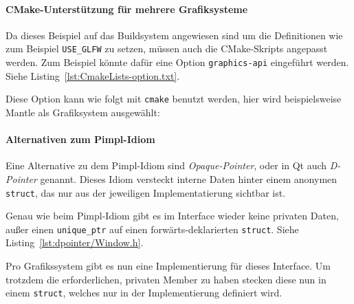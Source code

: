 \documentclass[12pt, a4paper, titlepage, hidelinks]{scrreprt}
\begin{document}
\paragraph{CMake-Unterstützung für mehrere Grafiksysteme}
Da dieses Beispiel auf das Buildsystem angewiesen sind um die Definitionen wie zum Beispiel \texttt{USE\_GLFW} zu setzen, müssen auch die CMake-Skripts angepasst werden. Zum Beispiel könnte dafür eine Option \texttt{graphics-api} eingeführt werden. Siehe Listing~\autoref{lst:CmakeLists-option.txt}.


Diese Option kann wie folgt mit \texttt{cmake} benutzt werden, hier wird beispielsweise Mantle als Grafiksystem ausgewählt:

\paragraph{Alternativen zum Pimpl-Idiom}
Eine Alternative zu dem Pimpl-Idiom sind \textit{Opaque-Pointer}, oder in Qt auch \textit{D-Pointer} genannt. Dieses Idiom versteckt interne Daten hinter einem anonymen \texttt{struct}, das nur aus der jeweiligen Implementatierung sichtbar ist. 

Genau wie beim Pimpl-Idiom gibt es im Interface wieder keine privaten Daten, außer einen \texttt{unique\_ptr} auf einen forwärts-deklarierten \texttt{struct}.  Siehe Listing~\autoref{lst:dpointer/Window.h}.


Pro Grafikssystem gibt es nun eine Implementierung für dieses Interface. Um trotzdem die erforderlichen, privaten Member zu haben stecken diese nun in einem \texttt{struct}, welches nur in der Implementierung definiert wird.

\end{document}
